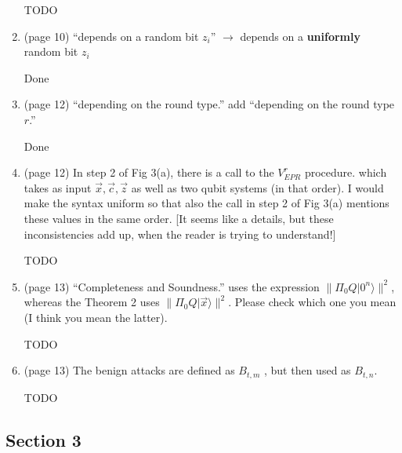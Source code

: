 \documentclass[12pt]{article}
\begin{document}
\begin{enumerate}
		{\color{red} TODO}

     \item (page 10) ``depends on a random bit $z_i$'' $\rightarrow$   depends on a \textbf{uniformly} random bit $z_i$
		
						{\color{blue}Done}

   \item (page 12) ``depending on the round type.'' add ``depending on the round type \textbf{$r$}.''
	
							{\color{blue}Done}

   \item (page 12) In step 2 of Fig 3(a), there is a call to the $V_{EPR}^r$ procedure. which takes as input $\overrightarrow{x}, \overrightarrow{c}, \overrightarrow{z}$ as well as two qubit systems (in that order). I would make the syntax uniform so that also the call in step 2 of Fig 3(a) mentions these values in the same order. [It seems like a details, but these inconsistencies add up, when the reader is trying to understand!]
	
			{\color{red} TODO}

       \item (page 13) ``Completeness and Soundness.'' uses the expression $\|\Pi_0Q|0^n\rangle\|^2$, whereas the Theorem 2 uses $\|\Pi_0Q|\overrightarrow{x}\rangle\|^2$. Please check which one you mean (I think you mean the latter).
			
						{\color{red} TODO}

       \item (page 13) The benign attacks are defined as $B_{t,m}$ , but then used as $B_{t,n}$.
			
						{\color{red} TODO}

   \end{enumerate}



\subsection*{Section 3}
\end{document}
